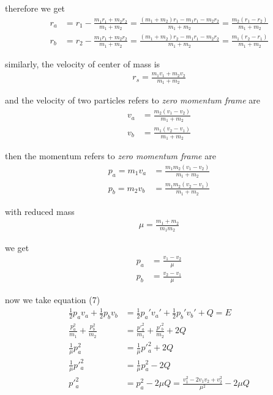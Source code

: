 \documentclass[11pt,a4paper]{article}
\begin{document}
\begin{enumerate}
therefore we get
\begin{align}
r_a&=r_1-\frac{m_1r_1+m_2r_2}{m_1+m_2}=\frac{(m_1+m_2)r_1-m_1r_1-m_2r_2}{m_1+m_2}=\frac{m_2(r_1-r_2)}{m_1+m_2} \\
r_b&=r_2-\frac{m_1r_1+m_2r_2}{m_1+m_2}=\frac{(m_1+m_2)r_2-m_1r_1-m_2r_2}{m_1+m_2}=\frac{m_1(r_2-r_1)}{m_1+m_2}
\end{align}

similarly, the velocity of center of mass is
\begin{align}
r_s=\frac{m_1v_1+m_2v_2}{m_1+m_2}
\end{align}

and the velocity of two particles refers to \textit{zero momentum frame} are
\begin{align}
v_a&=\frac{m_2(v_1-v_2)}{m_1+m_2} \\
v_b&=\frac{m_1(v_2-v_1)}{m_1+m_2}
\end{align}

then the momentum refers to \textit{zero momentum frame} are
\begin{align}
p_a=m_1v_a&=\frac{m_1m_2(v_1-v_2)}{m_1+m_2} \\
p_b=m_2v_b&=\frac{m_1m_2(v_2-v_1)}{m_1+m_2}
\end{align}

with reduced mass
\begin{align}
\mu=\frac{m_1+m_2}{m_1m_2}
\end{align}

we get
\begin{align}
p_a&=\frac{v_1-v_2}{\mu} \\
p_b&=\frac{v_2-v_1}{\mu}
\end{align}

now we take equation (7)
\begin{align}
\frac{1}{2}p_av_a+\frac{1}{2}p_bv_b&=\frac{1}{2}p_a'v_a'+\frac{1}{2}p_b'v_b'+Q=E \\
\frac{p^2_a}{m_1}+\frac{p^2_b}{m_2}&=\frac{p'^2_a}{m_1}+\frac{p'^2_b}{m_2}+2Q \\
\frac{1}{\mu}p^2_a&=\frac{1}{\mu}p'^2_a+2Q \\
\frac{1}{\mu}p'^2_a&=\frac{1}{\mu}p^2_a-2Q \\
p'^2_a&=p^2_a-2\mu Q=\frac{v_1^2-2v_1v_2+v_2^2}{\mu^2}-2\mu Q
\end{align}

\end{enumerate}
\end{document}
